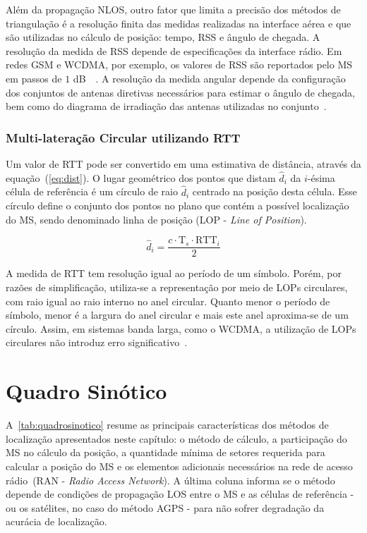 Além da propagação NLOS, outro fator que limita a precisão dos métodos de triangulação é a resolução finita das medidas realizadas na interface aérea e que são utilizadas no cálculo de posição: tempo, RSS e ângulo de chegada. A resolução da medida de RSS depende de especificações da interface rádio. Em redes GSM e WCDMA, por exemplo, os valores de RSS são reportados pelo MS em passos de $1$ dB~\cite{ETSI100911}~\cite{3GPP25133}. A resolução da medida angular depende da configuração dos conjuntos de antenas diretivas necessários para estimar o ângulo de chegada, bem como do diagrama de irradiação das antenas utilizadas no conjunto~\cite{Rappaport1997}.

\subsubsection{Multi-lateração Circular utilizando RTT}
Um valor de RTT pode ser convertido em uma estimativa de distância, através da equação~(\ref{eq:dist}). O lugar geométrico dos pontos que distam $\hat{d}_{i}$ da $i$-ésima célula de referência é um círculo de raio $\hat{d}_{i}$ centrado na posição desta célula. Esse círculo define o conjunto dos pontos no plano que contém a possível localização do MS, sendo denominado linha de posição (LOP - \textit{Line of Position}).

\begin{equation}
\label{eq:dist}
\hat{d}_{i}= \frac{c \cdot \textrm{T}_{s} \cdot \textrm{RTT}_{i}}{2}
\end{equation}

A medida de RTT tem resolução igual ao período de um símbolo. Porém, por razões de simplificação, utiliza-se a representação por meio de LOPs circulares, com raio igual ao raio interno no anel circular. Quanto menor o período de símbolo, menor é a largura do anel circular e mais este anel aproxima-se de um círculo. Assim, em sistemas banda larga, como o WCDMA, a utilização de LOPs circulares não introduz erro significativo~\cite{CidRttForcedHandover}.

\section{\textbf{Quadro Sinótico}}
\label{sec:Cap1Quadro}

A~\ref{tab:quadrosinotico} resume as principais características dos métodos de localização apresentados neste capítulo: o método de cálculo, a participação do MS no cálculo da posição, a quantidade mínima de setores requerida para calcular a posição do MS e os elementos adicionais necessários na rede de acesso rádio~(RAN - \textit{Radio Access Network}). A última coluna informa se o método depende de condições de propagação LOS entre o MS e as células de referência - ou os satélites, no caso do método AGPS - para não sofrer degradação da acurácia de localização.

